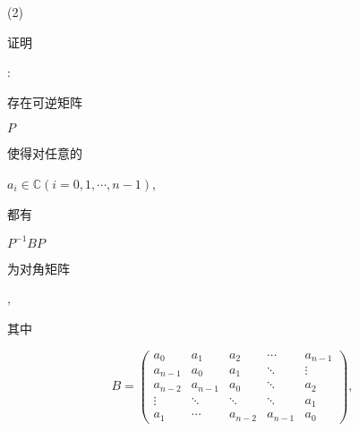 \documentclass[10pt]{article}
\begin{document}
(2) \begin{CJK}{UTF8}{mj}证明\end{CJK}: \begin{CJK}{UTF8}{mj}存在可逆矩阵\end{CJK} $P$ \begin{CJK}{UTF8}{mj}使得对任意的\end{CJK} $a_{i} \in \mathbb{C}(i=0,1, \cdots, n-1)$, \begin{CJK}{UTF8}{mj}都有\end{CJK} $P^{-1} B P$ \begin{CJK}{UTF8}{mj}为对角矩阵\end{CJK}, \begin{CJK}{UTF8}{mj}其中\end{CJK}
$$
B=\left(\begin{array}{ccccc}
a_{0} & a_{1} & a_{2} & \cdots & a_{n-1} \\
a_{n-1} & a_{0} & a_{1} & \ddots & \vdots \\
a_{n-2} & a_{n-1} & a_{0} & \ddots & a_{2} \\
\vdots & \ddots & \ddots & \ddots & a_{1} \\
a_{1} & \cdots & a_{n-2} & a_{n-1} & a_{0}
\end{array}\right),
$$
\end{document}
